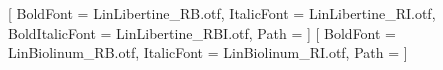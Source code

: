 \documentclass[a4paper, 15pt]{article}
\begin{document}
    \setmainfont{LinLibertine_R.otf}[
        BoldFont = LinLibertine_RB.otf,
        ItalicFont = LinLibertine_RI.otf,
        BoldItalicFont = LinLibertine_RBI.otf,
        Path = ]
    \setsansfont{LinBiolinum_R.otf}[
        BoldFont = LinBiolinum_RB.otf,
        ItalicFont = LinBiolinum_RI.otf,
        Path = ]
    \allsectionsfont{\rmfamily}
    \sectionfont{\normalsize\rmfamily}
    \subsectionfont{\small\rmfamily}


    \setlength{\parindent}{0cm}

    \newcommand{\truncateellipses}[2]{
       \truncate{#2}{#1}
    }

    \setcounter{secnumdepth}{0}

\end{document}
